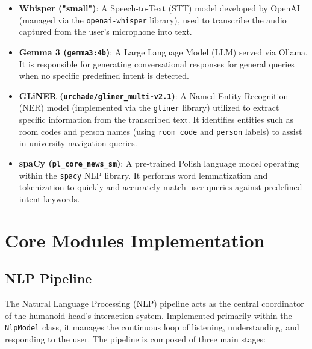 \documentclass{article}
\begin{document}
	\begin{itemize}
		\item \textbf{Whisper ("small")}: A Speech-to-Text (STT) model developed by OpenAI (managed via the \texttt{openai-whisper} library), used to transcribe the audio captured from the user's microphone into text.
		\item \textbf{Gemma 3 (\texttt{gemma3:4b})}: A Large Language Model (LLM) served via Ollama. It is responsible for generating conversational responses for general queries when no specific predefined intent is detected.
		\item \textbf{GLiNER (\texttt{urchade/gliner\_multi-v2.1})}: A Named Entity Recognition (NER) model (implemented via the \texttt{gliner} library) utilized to extract specific information from the transcribed text. It identifies entities such as room codes and person names (using \texttt{room code} and \texttt{person} labels) to assist in university navigation queries.
		\item \textbf{spaCy (\texttt{pl\_core\_news\_sm})}: A pre-trained Polish language model operating within the \texttt{spacy} NLP library. It performs word lemmatization and tokenization to quickly and accurately match user queries against predefined intent keywords.
	\end{itemize}
	
	
	\section{Core Modules Implementation}
	
	\subsection{NLP Pipeline}
	The Natural Language Processing (NLP) pipeline acts as the central coordinator of the humanoid head's interaction system. Implemented primarily within the \texttt{NlpModel} class, it manages the continuous loop of listening, understanding, and responding to the user. The pipeline is composed of three main stages:
	
\end{document}
